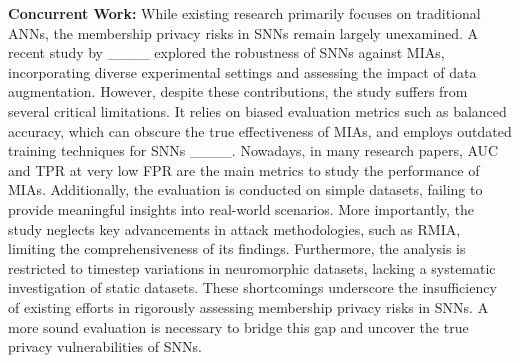 \textbf{Concurrent Work: } While existing research primarily focuses on traditional ANNs, the membership privacy risks in SNNs remain largely unexamined. A recent study by ____ explored the robustness of SNNs against MIAs, incorporating diverse experimental settings and assessing the impact of data augmentation. However, despite these contributions, the study suffers from several critical limitations. It relies on biased evaluation metrics such as balanced accuracy, which can obscure the true effectiveness of MIAs, and employs outdated training techniques for SNNs ____. Nowadays, in many research papers, AUC and TPR at very low FPR are the main metrics to study the performance of MIAs.
Additionally, the evaluation is conducted on simple datasets, failing to provide meaningful insights into real-world scenarios. 
%
More importantly, the study neglects key advancements in attack methodologies, such as RMIA, limiting the comprehensiveness of its findings. Furthermore, the analysis is restricted to timestep variations in neuromorphic datasets, lacking a systematic investigation of static datasets. These shortcomings underscore the insufficiency of existing efforts in rigorously assessing membership privacy risks in SNNs. A more sound evaluation is necessary to bridge this gap and uncover the true privacy vulnerabilities of SNNs.

\vspace{-0.3cm}